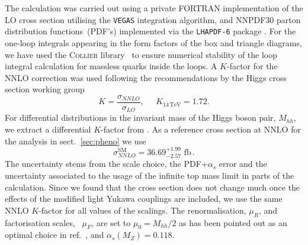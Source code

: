 The calculation was carried out using a private FORTRAN implementation of the LO cross section utilising the \texttt{VEGAS} integration algorithm, and NNPDF30 parton distribution functions~(PDF's)\cite{Ball:2017nwa} implemented via the \texttt{LHAPDF-6} package \cite{Buckley:2014ana}. For the one-loop integrals appearing in the form factors of the box and triangle diagrams, we have used the \textsc{Collier} library~\cite{Denner:2014gla} to ensure numerical stability of the loop integral calculation for massless quarks inside the loops.
A $K$-factor for the NNLO correction was used following the recommendations by the Higgs cross section working group~\cite{deFlorian:2016spz}
\begin{equation}
	K = \frac{\sigma_{NNLO}}{\sigma_{LO}}, \;\;\;\;\; K_{14\, \mathrm{ TeV}} = 1.72.
\end{equation}
For differential distributions in the invariant mass of the Higgs boson pair, $M_{hh}$, we extract a differential $K$-factor from \cite{Grazzini:2018bsd}.
As a reference cross section at NNLO \cite{Grazzini:2018bsd}  for the analysis in sect.~\ref{sec:pheno} we use
\begin{equation}
	\sigma^{\text{SM}}_{NNLO}=36.69^{+1.99}_{-2.57} \text{ fb}\,.
\end{equation}
The uncertainty stems from the scale choice, the PDF+$\alpha_s$ error and the uncertainty associated to the usage of the infinite top mass limit in parts of the calculation.
Since we found that the cross section does not change much once the effects of the modified light Yukawa couplings are included, we use the same NNLO $K$-factor for all values of the scalings.
The renormalisation, $\mu_R$, and factorisation scales, ~$ \mu_F$, are set to $\mu_0 =M_{hh}/2$ as has been pointed out as an optimal choice in ref.~\cite{deFlorian:2015moa}, and $\alpha_s(M_Z) = 0.118$.
